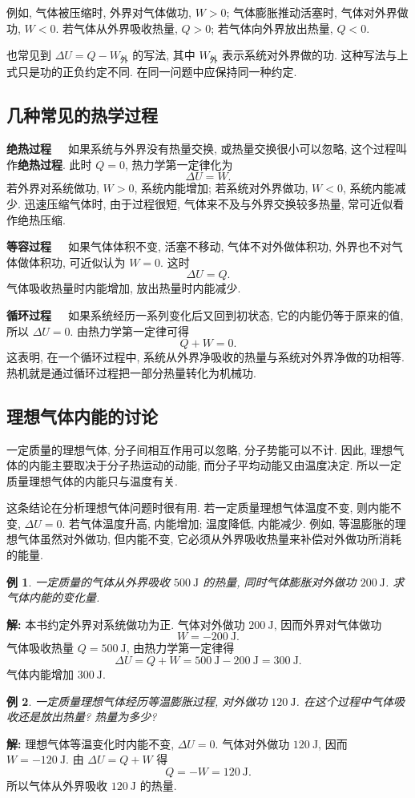 \documentclass[UTF8,openany,fontset=fandol]{ctexbook}
\theoremstyle{chinesetextbook}
\newtheorem{example}{例}[chapter]
\newenvironment{solution}{\par\indent\textbf{解:} \ignorespaces}{\par}
\newcommand{\bre}{\ \ \ }
\newcommand{\unit}[1]{\ \mathrm{#1}}
\begin{document}
例如, 气体被压缩时, 外界对气体做功, $W>0$; 气体膨胀推动活塞时, 气体对外界做功, $W<0$. 若气体从外界吸收热量, $Q>0$; 若气体向外界放出热量, $Q<0$.

也常见到 $\Delta U=Q-W_\text{外}$ 的写法, 其中 $W_\text{外}$ 表示系统对外界做的功. 这种写法与上式只是功的正负约定不同. 在同一问题中应保持同一种约定.
\subsection{几种常见的热学过程}
\textbf{绝热过程}\bre 如果系统与外界没有热量交换, 或热量交换很小可以忽略, 这个过程叫作\textbf{绝热过程}. 此时 $Q=0$, 热力学第一定律化为
\[
\Delta U=W.
\]
若外界对系统做功, $W>0$, 系统内能增加; 若系统对外界做功, $W<0$, 系统内能减少. 迅速压缩气体时, 由于过程很短, 气体来不及与外界交换较多热量, 常可近似看作绝热压缩.

\textbf{等容过程}\bre 如果气体体积不变, 活塞不移动, 气体不对外做体积功, 外界也不对气体做体积功, 可近似认为 $W=0$. 这时
\[
\Delta U=Q.
\]
气体吸收热量时内能增加, 放出热量时内能减少.

\textbf{循环过程}\bre 如果系统经历一系列变化后又回到初状态, 它的内能仍等于原来的值, 所以 $\Delta U=0$. 由热力学第一定律可得
\[
Q+W=0.
\]
这表明, 在一个循环过程中, 系统从外界净吸收的热量与系统对外界净做的功相等. 热机就是通过循环过程把一部分热量转化为机械功.
\subsection{理想气体内能的讨论}
一定质量的理想气体, 分子间相互作用可以忽略, 分子势能可以不计. 因此, 理想气体的内能主要取决于分子热运动的动能, 而分子平均动能又由温度决定. 所以一定质量理想气体的内能只与温度有关.

这条结论在分析理想气体问题时很有用. 若一定质量理想气体温度不变, 则内能不变, $\Delta U=0$. 若气体温度升高, 内能增加; 温度降低, 内能减少. 例如, 等温膨胀的理想气体虽然对外做功, 但内能不变, 它必须从外界吸收热量来补偿对外做功所消耗的能量.
\begin{example}
一定质量的气体从外界吸收 $500\unit{J}$ 的热量, 同时气体膨胀对外做功 $200\unit{J}$. 求气体内能的变化量.
\end{example}
\begin{solution}
本书约定外界对系统做功为正. 气体对外做功 $200\unit{J}$, 因而外界对气体做功
\[
W=-200\unit{J}.
\]
气体吸收热量 $Q=500\unit{J}$, 由热力学第一定律得
\[
\Delta U=Q+W=500\unit{J}-200\unit{J}=300\unit{J}.
\]
气体内能增加 $300\unit{J}$.
\end{solution}
\begin{example}
一定质量理想气体经历等温膨胀过程, 对外做功 $120\unit{J}$. 在这个过程中气体吸收还是放出热量? 热量为多少?
\end{example}
\begin{solution}
理想气体等温变化时内能不变, $\Delta U=0$. 气体对外做功 $120\unit{J}$, 因而 $W=-120\unit{J}$. 由 $\Delta U=Q+W$ 得
\[
Q=-W=120\unit{J}.
\]
所以气体从外界吸收 $120\unit{J}$ 的热量.
\end{solution}
\end{document}
